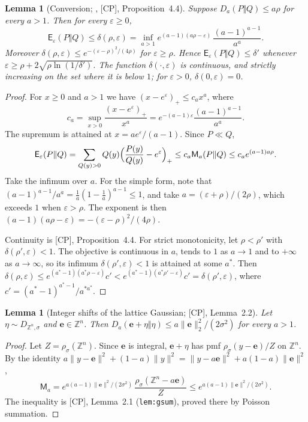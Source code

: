 \documentclass[11pt]{article}
\theoremstyle{definition}
\theoremstyle{plain}
\newtheorem{lemma}[definition]{Lemma}
\newcommand{\Z}{\mathbb{Z}}
\newcommand{\nrm}[1]{\lVert #1\rVert}
\newcommand{\HSd}{\mathsf{E}}
\newcommand{\Ma}{\mathsf{M}}
\newcommand{\CP}{\textup{[CP]}}
\begin{document}
\begin{lemma}[Conversion; \cite{CKS20}, \CP, Proposition~4.4]\label{lem:conv}
Suppose $D_a(P\Vert Q)\le a\rho$ for every $a>1$. Then for every $\varepsilon\ge0$,
\[
  \HSd_\varepsilon(P\Vert Q)\le\delta(\rho,\varepsilon)=\inf_{a>1}e^{(a-1)(a\rho-\varepsilon)}\,\frac{(a-1)^{a-1}}{a^a}.
\]
Moreover $\delta(\rho,\varepsilon)\le e^{-(\varepsilon-\rho)^2/(4\rho)}$ for $\varepsilon\ge\rho$. Hence $\HSd_\varepsilon(P\Vert Q)\le\delta'$ whenever $\varepsilon\ge\rho+2\sqrt{\rho\ln(1/\delta')}$. The function $\delta(\cdot,\varepsilon)$ is continuous, and strictly increasing on the set where it is below $1$; for $\varepsilon>0$, $\delta(0,\varepsilon)=0$.
\end{lemma}
\begin{proof}
For $x\ge0$ and $a>1$ we have $(x-e^\varepsilon)_+\le c_ax^a$, where
\[
  c_a=\sup_{x>0}\frac{(x-e^\varepsilon)_+}{x^a}=e^{-(a-1)\varepsilon}\frac{(a-1)^{a-1}}{a^a}.
\]
The supremum is attained at $x=ae^\varepsilon/(a-1)$. Since $P\ll Q$,
\[
  \HSd_\varepsilon(P\Vert Q)=\sum_{Q(y)>0}Q(y)\Bigl(\frac{P(y)}{Q(y)}-e^\varepsilon\Bigr)_+\le c_a\Ma_a(P\Vert Q)\le c_ae^{(a-1)a\rho} .
\]
Take the infimum over $a$. For the simple form, note that $(a-1)^{a-1}/a^a=\frac1a(1-\frac1a)^{a-1}\le1$, and take $a=(\varepsilon+\rho)/(2\rho)$, which exceeds $1$ when $\varepsilon>\rho$. The exponent is then $(a-1)(a\rho-\varepsilon)=-(\varepsilon-\rho)^2/(4\rho)$.

Continuity is \CP, Proposition~4.4. For strict monotonicity, let $\rho<\rho'$ with $\delta(\rho',\varepsilon)<1$. The objective is continuous in $a$, tends to $1$ as $a\to1$ and to $+\infty$ as $a\to\infty$, so its infimum $\delta(\rho',\varepsilon)<1$ is attained at some $a^*$. Then $\delta(\rho,\varepsilon)\le e^{(a^*-1)(a^*\rho-\varepsilon)}c'<e^{(a^*-1)(a^*\rho'-\varepsilon)}c'=\delta(\rho',\varepsilon)$, where $c'=(a^*-1)^{a^*-1}/a^{*a^*}$.
\end{proof}

\begin{lemma}[Integer shifts of the lattice Gaussian; \CP, Lemma~2.2]\label{lem:shift}
Let $\eta\sim D_{\Z^n,\sigma}$ and $\mathbf e\in\Z^n$. Then $D_a(\mathbf e+\eta\Vert\eta)\le a\nrm{\mathbf e}_2^2/(2\sigma^2)$ for every $a>1$.
\end{lemma}
\begin{proof}
Let $Z=\rho_\sigma(\Z^n)$. Since $\mathbf e$ is integral, $\mathbf e+\eta$ has pmf $\rho_\sigma(y-\mathbf e)/Z$ on $\Z^n$. By the identity $a\nrm{y-\mathbf e}^2+(1-a)\nrm y^2=\nrm{y-a\mathbf e}^2+a(1-a)\nrm{\mathbf e}^2$,
\[
  \Ma_a=e^{a(a-1)\nrm{\mathbf e}^2/(2\sigma^2)}\,\frac{\rho_\sigma(\Z^n-a\mathbf e)}{Z}\le e^{a(a-1)\nrm{\mathbf e}^2/(2\sigma^2)} .
\]
The inequality is \CP, Lemma~2.1 (\texttt{lem:gsum}), proved there by Poisson summation.
\end{proof}
\end{document}
